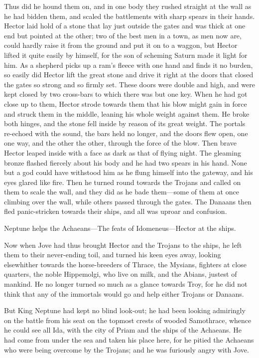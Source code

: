 Thus did he hound them on, and in one body they rushed straight at the
wall as he had bidden them, and scaled the battlements with sharp spears
in their hands. Hector laid hold of a stone that lay just outside the
gates and was thick at one end but pointed at the other; two of the best
men in a town, as men now are, could hardly raise it from the ground and
put it on to a waggon, but Hector lifted it quite easily by himself, for
the son of scheming Saturn made it light for him. As a shepherd picks up a
ram’s fleece with one hand and finds it no burden, so easily did Hector
lift the great stone and drive it right at the doors that closed the gates
so strong and so firmly set. These doors were double and high, and were
kept closed by two cross-bars to which there was but one key. When he had
got close up to them, Hector strode towards them that his blow might gain
in force and struck them in the middle, leaning his whole weight against
them. He broke both hinges, and the stone fell inside by reason of its
great weight. The portals re-echoed with the sound, the bars held no
longer, and the doors flew open, one one way, and the other the other,
through the force of the blow. Then brave Hector leaped inside with a face
as dark as that of flying night. The gleaming bronze flashed fiercely
about his body and he had two spears in his hand. None but a god could
have withstood him as he flung himself into the gateway, and his eyes
glared like fire. Then he turned round towards the Trojans and called on
them to scale the wall, and they did as he bade them—some of them at
once climbing over the wall, while others passed through the gates. The
Danaans then fled panic-stricken towards their ships, and all was uproar
and confusion.


Neptune helps the Achaeans—The feats of Idomeneus—Hector at
the ships.

Now when Jove had thus brought Hector and the Trojans to the ships, he
left them to their never-ending toil, and turned his keen eyes away,
looking elsewhither towards the horse-breeders of Thrace, the Mysians,
fighters at close quarters, the noble Hippemolgi, who live on milk, and
the Abians, justest of mankind. He no longer turned so much as a glance
towards Troy, for he did not think that any of the immortals would go and
help either Trojans or Danaans.

But King Neptune had kept no blind look-out; he had been looking
admiringly on the battle from his seat on the topmost crests of wooded
Samothrace, whence he could see all Ida, with the city of Priam and the
ships of the Achaeans. He had come from under the sea and taken his place
here, for he pitied the Achaeans who were being overcome by the Trojans;
and he was furiously angry with Jove.

